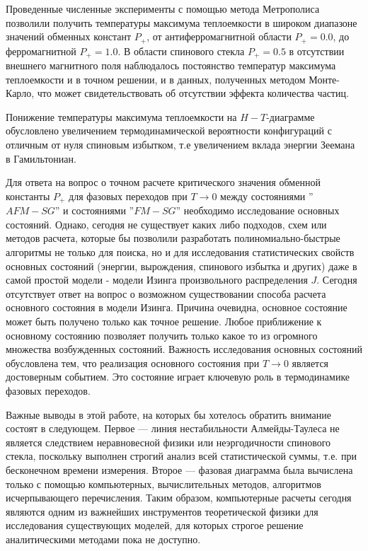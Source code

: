 Проведенные численные эксперименты с помощью метода Метрополиса позволили получить температуры максимума теплоемкости в широком диапазоне значений обменных констант $P_+$, от антиферромагнитной области $P_+=0.0$, до ферромагнитной $P_+=1.0$. В области спинового стекла $P_+=0.5$ в отсутствии внешнего магнитного поля наблюдалось постоянство температур максимума теплоемкости и в точном решении, и в данных, полученных методом Монте-Карло, что может свидетельствовать об отсутствии эффекта количества частиц.

Понижение температуры максимума теплоемкости на $H-T$-диаграмме обусловлено увеличением термодинамической вероятности конфигураций с отличным от нуля спиновым избытком, т.е увеличением вклада энергии Зеемана в Гамильтониан.

Для ответа на вопрос о точном расчете критического значения обменной константы $P_+$ для фазовых переходов при $T\rightarrow0$ между состояниями ''$AFM-SG$'' и состояниями ''$FM-SG$'' необходимо исследование основных состояний. Однако, сегодня не существует каких либо подходов, схем или методов расчета, которые бы позволили разработать полиномиально-быстрые алгоритмы не только для поиска, но и для исследования статистических свойств основных состояний (энергии, вырождения, спинового избытка и других) даже в самой простой модели - модели Изинга произвольного распределения $J$. Сегодня отсутствует ответ на вопрос о возможном существовании способа расчета основного состояния в модели Изинга. Причина очевидна, основное состояние может быть получено только как точное решение. Любое приближение к основному состоянию позволяет получить только какое то из огромного множества возбужденных состояний. Важность исследования основных состояний обусловлена тем, что реализация основного состояния при $T\rightarrow0$ является достоверным событием.  Это состояние играет ключевую роль в термодинамике фазовых переходов.

Важные выводы в этой работе, на которых бы хотелось обратить внимание состоят в следующем. Первое --- линия нестабильности Алмейды-Таулеса не является следствием неравновесной физики или неэргодичности спинового стекла, поскольку выполнен строгий анализ всей статистической суммы, т.е. при бесконечном времени измерения.  Второе --- фазовая диаграмма была вычислена только с помощью компьютерных, вычислительных методов, алгоритмов исчерпывающего перечисления. Таким образом, компьютерные расчеты сегодня являются одним из важнейших инструментов теоретической физики для исследования существующих моделей, для которых строгое решение аналитическими методами пока не доступно.